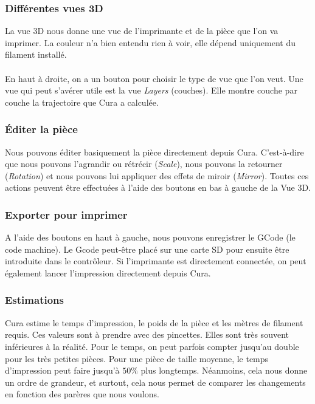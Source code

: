 \subsubsection{Différentes vues 3D}
La vue 3D nous donne une vue de l'imprimante et de la pièce que l'on va imprimer. La couleur n'a bien entendu rien à voir, elle dépend uniquement du filament installé.

\paragraph{} En haut à droite, on a un bouton pour choisir le type de vue que l'on veut. Une vue qui peut s'avérer utile est la vue \emph{Layers} (couches). Elle montre couche par couche la trajectoire que Cura a calculée.


\subsubsection{Éditer la pièce}

Nous pouvons éditer basiquement la pièce directement depuis Cura. C'est-à-dire que nous pouvons l'agrandir ou rétrécir (\emph{Scale}), nous pouvons la retourner (\emph{Rotation}) et nous pouvons lui appliquer des effets de miroir (\emph{Mirror}). Toutes ces actions peuvent être effectuées à l'aide des boutons en bas à gauche de la Vue 3D.

\subsubsection{Exporter pour imprimer}

A l'aide des boutons en haut à gauche, nous pouvons enregistrer le GCode (le code machine). Le Gcode peut-être placé sur une carte SD pour ensuite être introduite dans le contrôleur. Si l'imprimante est directement connectée, on peut également lancer l'impression directement depuis Cura.

\subsubsection{Estimations}

Cura estime le temps d'impression, le poids de la pièce et les mètres de filament requis. Ces valeurs sont à prendre avec des pincettes. Elles sont très souvent inférieures à la réalité. Pour le temps, on peut parfois compter jusqu'au double pour les très petites pièces. Pour une pièce de taille moyenne, le temps d'impression peut faire jusqu'à $50\%$ plus longtemps. Néanmoins, cela nous donne un ordre de grandeur, et surtout, cela nous permet de comparer les changements en fonction des parères que nous voulons. 

























